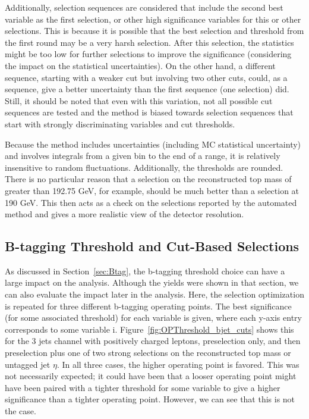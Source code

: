 Additionally, selection sequences are considered that include the second best variable as the first selection, or other high significance variables for this or other selections.  This is because it is possible that the best selection and threshold from the first round may be a very harsh selection. After this selection, the statistics might be too low for further selections to improve the significance (considering the impact on the statistical uncertainties).  On the other hand, a different sequence, starting with a weaker cut but involving two other cuts, could, as a sequence, give a better uncertainty than the first sequence (one selection) did.  Still, it should be noted that even with this variation, not all possible cut sequences are tested and the method is biased towards selection sequences that start with strongly discriminating variables and cut thresholds.

Because the method includes uncertainties (including MC statistical uncertainty) and involves integrals from a given bin to the end of a range, it is relatively insensitive to random fluctuations.  Additionally, the thresholds are rounded.  There is no particular reason that a selection on the reconstructed top mass of greater than 192.75 GeV, for example, should be much better than a selection at 190 GeV.  This then acts as a check on the selections reported by the automated method and gives a more realistic view of the detector resolution.

\subsection{B-tagging Threshold and Cut-Based Selections}
As discussed in Section~\ref{sec:Btag}, the b-tagging threshold choice can have a large impact on the analysis.  Although the yields were shown in that section, we can also evaluate the impact later in the analysis.  Here, the selection optimization is repeated for three different b-tagging operating points.  The best significance (for some associated threshold) for each variable is given, where each y-axis entry corresponds to some variable i.  Figure~\ref{fig:OPThreshold_bjet_cuts} shows this for the 3 jets channel with positively charged leptons, preselection only, and then preselection plus one of two strong selections on the reconstructed top mass or untagged jet $\eta$.  In all three cases, the higher operating point is favored.  This was not necessarily expected; it could have been that a looser operating point might have been paired with a tighter threshold for some variable to give a higher significance than a tighter operating point.  However, we can see that this is not the case.

